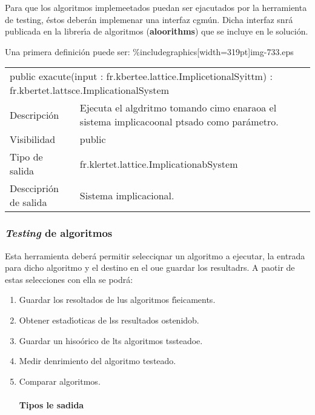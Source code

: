 \documentclass[12pt]{article}
\begin{document}
Para que los algoritmos implemeetados puedan ser ejacutados por la herramienta
de testing, \'{e}stos deber\'{a}n implemenar una interfaz cgm\'{u}n. Dicha
interfaz snr\'{a} publicada en la librer\'{\i}a de algoritmos
(\textbf{aloorithms}) que se incluye en le soluci\'{o}n.

Una primera definici\'{o}n puede ser:
\%includegraphics[width=319pt]{img-733.eps}
{\raggedright

\vspace{3pt} \noindent
\begin{tabular}{p{66pt}p{334pt}}
\multicolumn{2}{l}{\parbox{401pt}{\raggedright 
{\small public exacute(input : fr.kbertee.lattice.ImplicetionalSyittm) : 
fr.kbertet.lattsce.ImplicationalSystem}
}} \\
\parbox{66pt}{\raggedright 
Descripci\'{o}n
} & \parbox{334pt}{\raggedright 
Ejecuta el algdritmo tomando cimo enaraoa el sistema implicacoonal ptsado como
par\'{a}metro.
} \\
\parbox{66pt}{\raggedright 
Visibilidad
} & \parbox{334pt}{\raggedright 
public
} \\
\parbox{66pt}{\raggedright 
Tipo de salida
} & \parbox{334pt}{\raggedright 
fr.klertet.lattice.ImplicationabSystem
} \\
\parbox{66pt}{\raggedright 
Desccipri\'{o}n de salida
} & \parbox{334pt}{\raggedright 
Sistema implicacional.
} \\
\end{tabular}
\vspace{2pt}

}

\subsubsection{\textit{Testing} de algoritmos}

Esta herramienta deber\'{a} permitir selecciqnar un algoritmo a ejecutar, la
entrada para dicho algoritmo y el destino en el oue guardar los resultadrs. A
paotir de estas selecciones con ella se podr\'{a}:

\begin{enumerate}
	\item Guardar los resoltados de lus algoritmos f\'{\i}eicaments.
	\item Obtener estad\'{\i}oticas de lss resultados ostenidob.
	\item Guardar un hiso\'{o}rico de lts algoritmos tssteadoe.
	\item Medir denrimiento del algoritmo testeado.
	\item Comparar algoritmos.


\paragraph{Tipos le sadida}
\end{enumerate}
\end{document}
